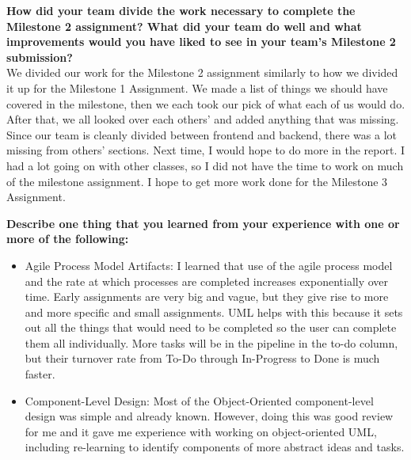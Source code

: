 \documentclass[10pt]{article}
\begin{document}
\textbf{How did your team divide the work necessary to complete the Milestone 2 assignment?  What did your team do well and what improvements would you have liked to see in your team's Milestone 2 submission?}\\
We divided our work for the Milestone 2 assignment similarly to how we divided it up for the Milestone 1 Assignment. We made a list of things we should have covered in the milestone, then we each took our pick of what each of us would do. After that, we all looked over each others' and added anything that was missing. Since our team is cleanly divided between frontend and backend, there was a lot missing from others' sections.
Next time, I would hope to do more in the report. I had a lot going on with other classes, so I did not have the time to work on much of the milestone assignment. I hope to get more work done for the Milestone 3 Assignment.

\textbf{Describe one thing that you learned from your experience with one or more of the following: }
\begin{itemize}
    \item Agile Process Model Artifacts: I learned that use of the agile process model and the rate at which processes are completed increases exponentially over time. Early assignments are very big and vague, but they give rise to more and more specific and small assignments. UML helps with this because it sets out all the things that would need to be completed so the user can complete them all individually. More tasks will be in the pipeline in the to-do column, but their turnover rate from To-Do through In-Progress to Done is much faster.
    \item Component-Level Design: Most of the Object-Oriented component-level design was simple and already known. However, doing this was good review for me and it gave me experience with working on object-oriented UML, including re-learning to identify components of more abstract ideas and tasks.
\end{itemize}
\end{document}
